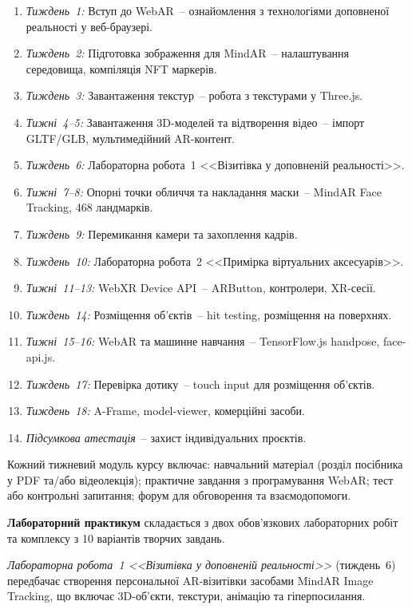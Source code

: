 \begin{enumerate}[label=\arabic*.]
\item \textit{Тиждень~1:} Вступ до WebAR~-- ознайомлення з технологіями доповненої реальності у веб-браузері.
\item \textit{Тиждень~2:} Підготовка зображення для MindAR~-- налаштування середовища, компіляція NFT маркерів.
\item \textit{Тиждень~3:} Завантаження текстур~-- робота з текстурами у Three.js.
\item \textit{Тижні~4--5:} Завантаження 3D-моделей та відтворення відео~-- імпорт GLTF/GLB, мультимедійний AR-контент.
\item \textit{Тиждень~6:} Лабораторна робота~1 <<Візитівка у доповненій реальності>>.
\item \textit{Тижні~7--8:} Опорні точки обличчя та накладання маски~-- MindAR Face Tracking, 468 ландмарків.
\item \textit{Тиждень~9:} Перемикання камери та захоплення кадрів.
\item \textit{Тиждень~10:} Лабораторна робота~2 <<Примірка віртуальних аксесуарів>>.
\item \textit{Тижні~11--13:} WebXR Device API~-- ARButton, контролери, XR-сесії.
\item \textit{Тиждень~14:} Розміщення об'єктів~-- hit testing, розміщення на поверхнях.
\item \textit{Тижні~15--16:} WebAR та машинне навчання~-- TensorFlow.js handpose, face-api.js.
\item \textit{Тиждень~17:} Перевірка дотику~-- touch input для розміщення об'єктів.
\item \textit{Тиждень~18:} A-Frame, model-viewer, комерційні засоби.
\item \textit{Підсумкова атестація}~-- захист індивідуальних проєктів.
\end{enumerate}

Кожний тижневий модуль курсу включає: навчальний матеріал (розділ посібника у PDF та/або відеолекція); практичне завдання з програмування WebAR; тест або контрольні запитання; форум для обговорення та взаємодопомоги.

\textbf{Лабораторний практикум} складається з двох обов'язкових лабораторних робіт та комплексу з 10 варіантів творчих завдань.

\textit{Лабораторна робота~1 <<Візитівка у доповненій реальності>>} (тиждень~6) передбачає створення персональної AR-візитівки засобами MindAR Image Tracking, що включає 3D-об'єкти, текстури, анімацію та гіперпосилання.

